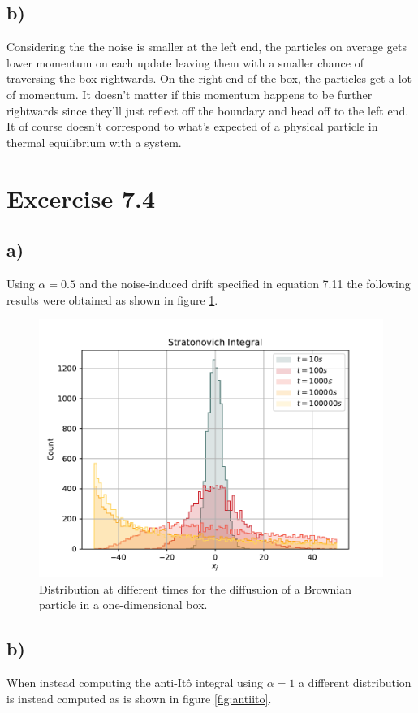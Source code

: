 \documentclass[a4paper, 12pt]{article}
\begin{document}
\subsection*{b)}
Considering the the noise is smaller at the left end, the particles on average gets lower momentum on each update leaving them with a smaller chance of traversing the box rightwards. On the right end of the box, the particles get a lot of momentum. It doesn't matter if this momentum happens to be further rightwards since they'll just reflect off the boundary and head off to the left end. It of course doesn't correspond to what's expected of a physical particle in thermal equilibrium with a system.

\newpage

\section*{Excercise 7.4}
\subsection*{a)}
Using $\alpha = 0.5$ and the noise-induced drift specified in equation 7.11 the following results were obtained as shown in figure \ref{fig:strat}.

\begin{figure}[h!]
    \centering
    \includegraphics[width=0.8\linewidth]{../Spurious-Drift/stratonovich.pdf}
    \caption{Distribution at different times for the diffusuion of a Brownian particle in a one-dimensional box.}
    \label{fig:strat}
\end{figure}

\subsection*{b)}
When instead computing the anti-Itô integral using $\alpha = 1$ a different distribution is instead computed as is shown in figure \ref{fig:antiito}.
\end{document}

